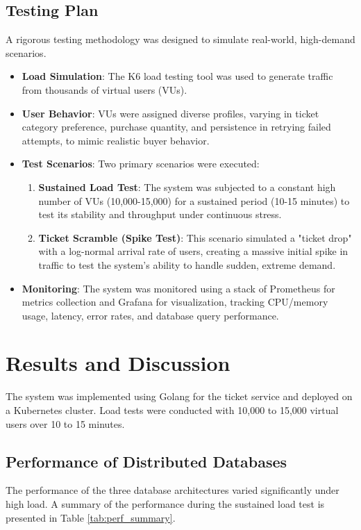 \subsection{Testing Plan}
A rigorous testing methodology was designed to simulate real-world, high-demand scenarios.
\begin{itemize}
    \item \textbf{Load Simulation}: The K6 load testing tool was used to generate traffic from thousands of virtual users (VUs).
    \item \textbf{User Behavior}: VUs were assigned diverse profiles, varying in ticket category preference, purchase quantity, and persistence in retrying failed attempts, to mimic realistic buyer behavior.
    \item \textbf{Test Scenarios}: Two primary scenarios were executed:
          \begin{enumerate}
              \item \textbf{Sustained Load Test}: The system was subjected to a constant high number of VUs (10,000-15,000) for a sustained period (10-15 minutes) to test its stability and throughput under continuous stress.
              \item \textbf{Ticket Scramble (Spike Test)}: This scenario simulated a "ticket drop" with a log-normal arrival rate of users, creating a massive initial spike in traffic to test the system's ability to handle sudden, extreme demand.
          \end{enumerate}
    \item \textbf{Monitoring}: The system was monitored using a stack of Prometheus for metrics collection and Grafana for visualization, tracking CPU/memory usage, latency, error rates, and database query performance.
\end{itemize}

\section{Results and Discussion}
\label{sec:results}
The system was implemented using Golang for the ticket service and deployed on a Kubernetes cluster. Load tests were conducted with 10,000 to 15,000 virtual users over 10 to 15 minutes.

\subsection{Performance of Distributed Databases}
The performance of the three database architectures varied significantly under high load. A summary of the performance during the sustained load test is presented in Table \ref{tab:perf_summary}.

